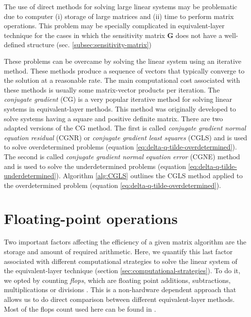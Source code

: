 \documentclass[utf8]{FrontiersinHarvard} %
\begin{document}
	The use of direct methods for solving large linear systems may be problematic due to computer 
	(i) storage of large matrices and (ii) time to perform matrix operations.
	This problem may be specially complicated in equivalent-layer technique for the cases in which 
	the sensitivity matrix $\mathbf{G}$ does not have a well-defined structure (sec. \ref{subsec:sensitivity-matrix})
	
	These problems can be overcame by solving the linear system using an iterative method.
	These methods produce a sequence of vectors that typically converge to the solution at a
	reasonable rate. The main computational cost associated with these methods is usually some matrix-vector products 
	per iteration.
	The \textit{conjugate gradient} (CG) is a very popular iterative method for solving linear systems in equivalent-layer methods.
	This method was originally developed to solve systems having a square and positive definite matrix.
	There are two adapted versions of the CG method. The first is called \textit{conjugate gradient normal equation residual} (CGNR) 
	\citet[][sec. 11.3]{golub-vanloan2013} or \textit{conjugate gradient least squares} (CGLS) \cite[][p. 165]{aster_etal2019} and is
	used to solve overdetermined problems (equation \ref{eq:delta-q-tilde-overdetermined}). 
	The second is called \textit{conjugate gradient normal equation error} (CGNE) method 
	\citet[][sec. 11.3]{golub-vanloan2013} and is used to solve the underdetermined problems (equation \ref{eq:delta-q-tilde-underdetermined}).
	Algorithm \ref{alg:CGLS} outlines the CGLS method applied to the overdetermined problem (equation \ref{eq:delta-q-tilde-overdetermined}).
	
	\section{Floating-point operations}
	\label{sec:flops}
	
	Two important factors affecting the efficiency of a given matrix algorithm are the storage and amount of required arithmetic. 
	Here, we quantify this last factor associated with different computational strategies to solve the linear system of the
	equivalent-layer technique (section \ref{sec:computational-strategies}). To do it, we opted by counting \textit{flops},
	which are floating point additions, subtractions, multiplications or divisions \cite[][ p. 12--14]{golub-vanloan2013}.
	This is a non-hardware dependent approach that allows us to do direct comparison between different equivalent-layer methods.
	Most of the flops count used here can be found in \citet[][p. 12, 106, 107 and 164]{golub-vanloan2013}.
	
\end{document}
